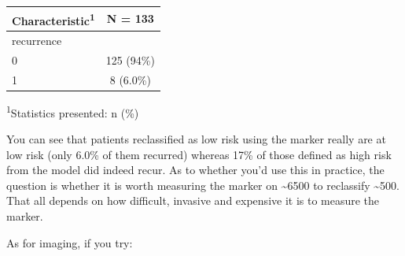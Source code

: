 \documentclass[]{book}
\newenvironment{Shaded}{\begin{snugshade}}{\end{snugshade}}
\newcommand{\DataTypeTok}[1]{\textcolor[rgb]{0.13,0.29,0.53}{#1}}
\newcommand{\KeywordTok}[1]{\textcolor[rgb]{0.13,0.29,0.53}{\textbf{#1}}}
\newcommand{\NormalTok}[1]{#1}
\newcommand{\OperatorTok}[1]{\textcolor[rgb]{0.81,0.36,0.00}{\textbf{#1}}}
\newcommand{\StringTok}[1]{\textcolor[rgb]{0.31,0.60,0.02}{#1}}
\begin{document}
\captionsetup[table]{labelformat=empty,skip=1pt}
\begin{longtable}{lc}
\toprule
\textbf{Characteristic}\textsuperscript{1} & \textbf{N = 133} \\ 
\midrule
recurrence &  \\ 
0 & 125 (94\%) \\ 
1 & 8 (6.0\%) \\ 
\bottomrule
\end{longtable}
\vspace{-5mm}
\begin{minipage}{\linewidth}
\textsuperscript{1}Statistics presented: n (\%) \\ 
\end{minipage}

You can see that patients reclassified as low risk using the marker really are at low risk (only 6.0\% of them recurred) whereas 17\% of those defined as high risk from the model did indeed recur. As to whether you'd use this in practice, the question is whether it is worth measuring the marker on \textasciitilde6500 to reclassify \textasciitilde500. That all depends on how difficult, invasive and expensive it is to measure the marker.

As for imaging, if you try:

\begin{Shaded}
\end{Shaded}
\end{document}
